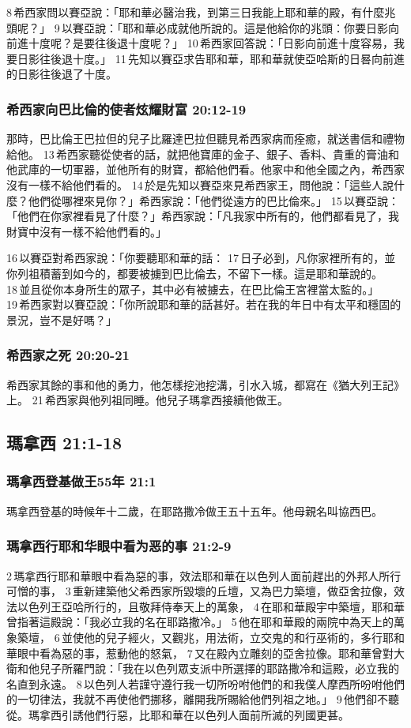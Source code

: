 8 希西家問以賽亞說：「耶和華必醫治我，到第三日我能上耶和華的殿，有什麼兆頭呢？」 9 以賽亞說：「耶和華必成就他所說的。這是他給你的兆頭：你要日影向前進十度呢？是要往後退十度呢？」 10 希西家回答說：「日影向前進十度容易，我要日影往後退十度。」 11 先知以賽亞求告耶和華，耶和華就使亞哈斯的日晷向前進的日影往後退了十度。

\subsubsection{希西家向巴比倫的使者炫耀財富 20:12-19}
那時，巴比倫王巴拉但的兒子比羅達巴拉但聽見希西家病而痊癒，就送書信和禮物給他。 13 希西家聽從使者的話，就把他寶庫的金子、銀子、香料、貴重的膏油和他武庫的一切軍器，並他所有的財寶，都給他們看。他家中和他全國之內，希西家沒有一樣不給他們看的。 14 於是先知以賽亞來見希西家王，問他說：「這些人說什麼？他們從哪裡來見你？」希西家說：「他們從遠方的巴比倫來。」 15 以賽亞說：「他們在你家裡看見了什麼？」希西家說：「凡我家中所有的，他們都看見了，我財寶中沒有一樣不給他們看的。」

16 以賽亞對希西家說：「你要聽耶和華的話： 17 日子必到，凡你家裡所有的，並你列祖積蓄到如今的，都要被擄到巴比倫去，不留下一樣。這是耶和華說的。 18 並且從你本身所生的眾子，其中必有被擄去，在巴比倫王宮裡當太監的。」 19 希西家對以賽亞說：「你所說耶和華的話甚好。若在我的年日中有太平和穩固的景況，豈不是好嗎？」

\subsubsection{希西家之死 20:20-21}
希西家其餘的事和他的勇力，他怎樣挖池挖溝，引水入城，都寫在《猶大列王記》上。 21 希西家與他列祖同睡。他兒子瑪拿西接續他做王。

\subsection{瑪拿西 21:1-18 }
\subsubsection{瑪拿西登基做王55年 21:1}
瑪拿西登基的時候年十二歲，在耶路撒冷做王五十五年。他母親名叫協西巴。

\subsubsection{瑪拿西行耶和华眼中看为恶的事 21:2-9}
 2 瑪拿西行耶和華眼中看為惡的事，效法耶和華在以色列人面前趕出的外邦人所行可憎的事， 3 重新建築他父希西家所毀壞的丘壇，又為巴力築壇，做亞舍拉像，效法以色列王亞哈所行的，且敬拜侍奉天上的萬象， 4 在耶和華殿宇中築壇，耶和華曾指著這殿說：「我必立我的名在耶路撒冷。」 5 他在耶和華殿的兩院中為天上的萬象築壇， 6 並使他的兒子經火，又觀兆，用法術，立交鬼的和行巫術的，多行耶和華眼中看為惡的事，惹動他的怒氣， 7 又在殿內立雕刻的亞舍拉像。耶和華曾對大衛和他兒子所羅門說：「我在以色列眾支派中所選擇的耶路撒冷和這殿，必立我的名直到永遠。 8 以色列人若謹守遵行我一切所吩咐他們的和我僕人摩西所吩咐他們的一切律法，我就不再使他們挪移，離開我所賜給他們列祖之地。」 9 他們卻不聽從。瑪拿西引誘他們行惡，比耶和華在以色列人面前所滅的列國更甚。


